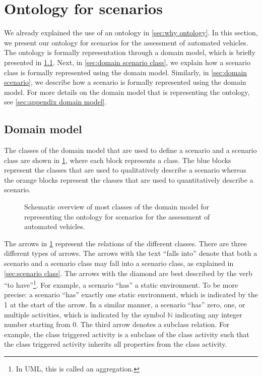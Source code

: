 \cbstart
\section{Ontology for scenarios}
\label{sec:ontology}

We already explained the use of an ontology in \cref{sec:why ontology}. In this section, we present our ontology for scenarios for the assessment of automated vehicles. The ontology is formally representation through a domain model, which is briefly presented in \cref{sec:domain model}. Next, in \cref{sec:domain scenario class}, we explain how a scenario class is formally represented using the domain model. Similarly, in \cref{sec:domain scenario}, we describe how a scenario is formally represented using the domain model. For more details on the domain model that is representing the ontology, see \cref{sec:appendix domain model}.



\subsection{Domain model}
\label{sec:domain model}

The classes of the domain model that are used to define a scenario and a scenario class are shown in \cref{fig:ontology classes}, where each block represents a class. The blue blocks represent the classes that are used to qualitatively describe a scenario whereas the orange blocks represent the classes that are used to quantitatively describe a scenario. 

\cbend
\begin{figure}
	\centering
	
	\caption{\cbstart Schematic overview of most classes of the domain model for representing the ontology for scenarios for the assessment of automated vehicles.\cbend}
	\label{fig:ontology classes}
\end{figure}
\cbstart

The arrows in \cref{fig:ontology classes} represent the relations of the different classes. There are three different types of arrows. The arrows with the text ``falls into'' denote that both a scenario and a scenario class may fall into a scenario class, as explained in \cref{sec:scenario class}. The arrows with the diamond are best described by the verb ``to have''\footnote{\cbstart In UML, this is called an aggregation.\cbend}. For example, a scenario ``has'' a static environment. To be more precise: a scenario ``has'' exactly one static environment, which is indicated by the 1 at the start of the arrow. In a similar manner, a scenario ``has'' zero, one, or multiple activities, which is indicated by the symbol $\mathbb{N}$ indicating any integer number starting from 0. The third arrow denotes a subclass relation. For example, the class triggered activity is a subclass of the class activity such that the class triggered activity inherits all properties from the class activity.



